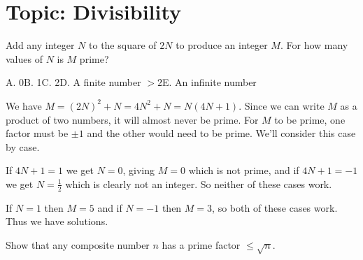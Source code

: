 

\DeclareRobustCommand{\stirling}{\genfrac\{\}{0pt}{}}
\setcounter{secnumdepth}{0} 

\newcommand{\weekNum}{6} %
\newcommand{\meetingDate}{February 26th, 2025} 


\pagestyle{empty}
\sloppy
\maketitle
 
\section{Topic: Divisibility}

\begin{problem}
    Add any integer \( N \) to the square of \( 2N \) to produce an integer \( M \). For how many values of \( N \) is \( M \) prime?
\end{problem}\vspace{5pt}
\hspace{10pt}A. 0\hfill B. 1\hfill C. 2\hfill D. A finite number \(> 2\)\hfill E. An infinite number\hspace{10pt}

\begin{solution}[C]
    We have
    \(
        M = (2N)^2+N = 4N^2+N = N(4N+1).
    \)
    Since we can write \(M\) as a product of two numbers, it will almost never be prime. For \(M\) to be prime, one factor must be \(\pm1\) and the other would need to be prime. We'll consider this case by case.
    
    If \(4N+1 = 1\) we get \(N=0\), giving \(M=0\) which is not prime, and if \(4N+1 = -1\) we get \(N=\frac{1}{2}\) which is clearly not an integer. So neither of these cases work.
    
    If \(N=1\) then \(M=5\) and if \(N=-1\) then \(M=3\), so both of these cases work. Thus we have  solutions.
\end{solution}

\begin{problem}[D][2][MONT 1.12/1]
    Show that any composite number \(n\) has a prime factor \(\leq \sqrt{n}\).
\end{problem}


